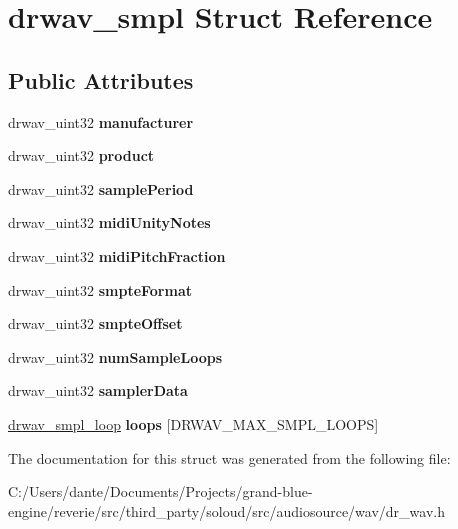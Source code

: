 \hypertarget{structdrwav__smpl}{}\section{drwav\+\_\+smpl Struct Reference}
\label{structdrwav__smpl}
\subsection*{Public Attributes}
\begin{DoxyCompactItemize}
\item 
\mbox{\label{structdrwav__smpl_a7fdc89c97102bd511d06bf2716ec0634}} 
drwav\+\_\+uint32 {\bfseries manufacturer}
\item 
\mbox{\label{structdrwav__smpl_aea7fc1664f91ec1637dc7f0216805302}} 
drwav\+\_\+uint32 {\bfseries product}
\item 
\mbox{\label{structdrwav__smpl_a0172803c3912f0c49e773a85f7f518ca}} 
drwav\+\_\+uint32 {\bfseries sample\+Period}
\item 
\mbox{\label{structdrwav__smpl_a9ccc93eeeef6c22e41f1a8ee3a5ea651}} 
drwav\+\_\+uint32 {\bfseries midi\+Unity\+Notes}
\item 
\mbox{\label{structdrwav__smpl_a5544a723488dc8366aca3a88550f6934}} 
drwav\+\_\+uint32 {\bfseries midi\+Pitch\+Fraction}
\item 
\mbox{\label{structdrwav__smpl_a984cf30eedef739a3eec02c5e5506096}} 
drwav\+\_\+uint32 {\bfseries smpte\+Format}
\item 
\mbox{\label{structdrwav__smpl_a6291fe764ee12e0bcfc34295f2f68b1c}} 
drwav\+\_\+uint32 {\bfseries smpte\+Offset}
\item 
\mbox{\label{structdrwav__smpl_a8d80b719a95940e83c6c7e06c2df858f}} 
drwav\+\_\+uint32 {\bfseries num\+Sample\+Loops}
\item 
\mbox{\label{structdrwav__smpl_a79e76e9d290dc97b2db70a86da9f9d32}} 
drwav\+\_\+uint32 {\bfseries sampler\+Data}
\item 
\mbox{\label{structdrwav__smpl_af6be40ab1b9d1c2f2f4fa683462fdb8b}} 
\mbox{\hyperlink{structdrwav__smpl__loop}{drwav\+\_\+smpl\+\_\+loop}} {\bfseries loops} \mbox{[}D\+R\+W\+A\+V\+\_\+\+M\+A\+X\+\_\+\+S\+M\+P\+L\+\_\+\+L\+O\+O\+PS\mbox{]}
\end{DoxyCompactItemize}


The documentation for this struct was generated from the following file\+:\begin{DoxyCompactItemize}
\item 
C\+:/\+Users/dante/\+Documents/\+Projects/grand-\/blue-\/engine/reverie/src/third\+\_\+party/soloud/src/audiosource/wav/dr\+\_\+wav.\+h\end{DoxyCompactItemize}

